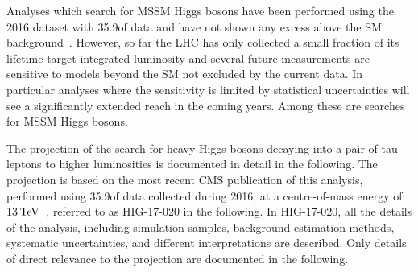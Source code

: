 %
Analyses which search for MSSM Higgs bosons have been performed using the 2016 dataset with 35.9\fbinv of data and have not shown any excess above the 
SM background~\cite{HIG-18-014,HIG-16-018,HIG-17-020}.
However, so far the LHC has only collected a small fraction of its lifetime target integrated luminosity and
several future measurements are sensitive to models beyond the SM not excluded by the current data. In particular 
analyses where the sensitivity is limited by statistical uncertainties will see a significantly extended reach in the 
coming years. Among these are searches for MSSM Higgs bosons.

The projection of the search for heavy Higgs bosons decaying into a pair of tau leptons to higher
luminosities is documented in detail in the following. The projection is based on the most recent CMS 
publication of this analysis, performed using 35.9\fbinv of data collected during 2016, at a centre-of-mass
energy of 13$\,\mathrm{TeV}$~\cite{HIG-17-020}, referred to as HIG-17-020 in the following. 
In HIG-17-020, all the details of the analysis, including simulation samples, background estimation methods,
systematic uncertainties, and different interpretations are described. 
Only details of direct relevance to the projection are documented in the following.

